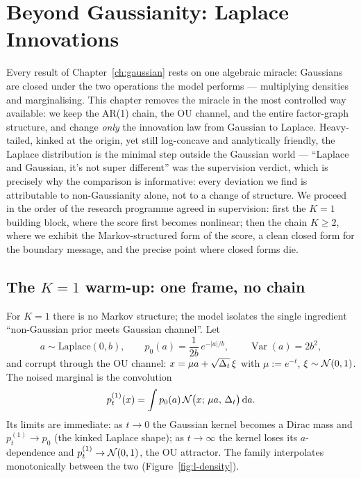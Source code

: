 \chapter{Beyond Gaussianity: Laplace Innovations}\label{ch:laplace}

Every result of Chapter~\ref{ch:gaussian} rests on one algebraic miracle:
Gaussians are closed under the two operations the model performs ---
multiplying densities and marginalising. This chapter removes the miracle in
the most controlled way available: we keep the AR(1) chain, the OU channel,
and the entire factor-graph structure, and change \emph{only} the innovation
law from Gaussian to Laplace. Heavy-tailed, kinked at the origin, yet still
log-concave and analytically friendly, the Laplace distribution is the
minimal step outside the Gaussian world --- ``Laplace and Gaussian, it's not
super different'' was the supervision verdict, which is precisely why the
comparison is informative: every deviation we find is attributable to
non-Gaussianity alone, not to a change of structure. We proceed in the order
of the research programme agreed in supervision: first the $K = 1$ building
block, where the score first becomes nonlinear; then the chain $K \geq 2$,
where we exhibit the Markov-structured form of the score, a clean closed
form for the boundary message, and the precise point where closed forms die.

\section{The $K = 1$ warm-up: one frame, no chain}\label{sec:l-K1}

For $K = 1$ there is no Markov structure; the model isolates the single
ingredient ``non-Gaussian prior meets Gaussian channel''. Let
\begin{equation}
  a \sim \mathrm{Laplace}(0, b), \qquad
  p_0(a) = \frac{1}{2b}\, e^{-|a|/b}, \qquad
  \operatorname{Var}(a) = 2b^2 ,
  \label{eq:l-prior}
\end{equation}
and corrupt through the OU channel: $x = \mu a + \sqrt{\Delta_t}\,\xi$ with
$\mu := e^{-t}$, $\xi \sim \mathcal{N}(0,1)$. The noised marginal is the
convolution
\begin{equation}
  p_t^{(1)}(x) = \int p_0(a)\, \mathcal{N}\big(x;\, \mu a,\, \Delta_t\big)\, \mathrm{d} a .
  \label{eq:l-pt1}
\end{equation}
Its limits are immediate: as $t \to 0$ the Gaussian kernel becomes a Dirac
mass and $p_t^{(1)} \to p_0$ (the kinked Laplace shape); as $t \to \infty$
the kernel loses its $a$-dependence and $p_t^{(1)} \to \mathcal{N}(0, 1)$, the OU
attractor. The family interpolates monotonically between the two
(Figure~\ref{fig:l-density}).

